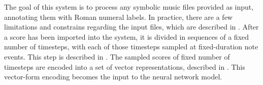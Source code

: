 

The goal of this system is to process any symbolic music
files provided as input, annotating them with Roman numeral
labels. In practice, there are a few limitations and
constrains regarding the input files, which are described in
. After a score has
been imported into the system, it is divided in sequences of
a fixed number of timesteps, with each of those timesteps
sampled at fixed-duration note events. This step is
described in . The sampled
scores of fixed number of timesteps are encoded into a set
of vector representations, described in
. This vector-form encoding
becomes the input to the neural network model.
